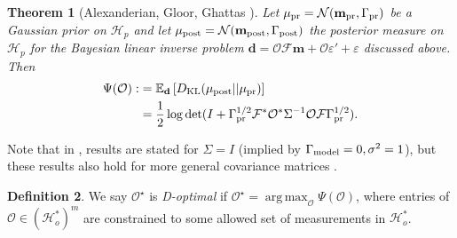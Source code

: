 \documentclass[ba]{imsart}
\newcommand{\eps}{\varepsilon}
\newcommand{\hilp}{\mathcal{H}_p}
\newcommand{\hilo}{\mathcal{H}_o}
\newcommand{\obs}{\mathcal{O}}
\newcommand{\fwd}{\mathcal{F}}
\newcommand{\tar}{\Psi}
\DeclareMathOperator*{\argmax}{arg\,max}
\newcommand{\data}{\mathbf{d}}
\newcommand{\param}{\mathbf{m}}
\newcommand{\normal}{\mathcal{N}}
\newcommand{\pr}{\mu_{\textup{pr}}} \newcommand{\post}{\mu_{\textup{post}}} \newcommand{\prmean}{\param_{\textup{pr}}} \newcommand{\postmean}{\param_{\textup{post}}} \newcommand{\postcov}{\Gamma_{\textup{post}}} \newcommand{\prcov}{\Gamma_{\textup{pr}}} \newcommand{\modcov}{\Gamma_{\textup{model}}} \newcommand{\tmp}{\mathcal{G}}
\newcommand{\opt}{\mathcal{D}}
\theoremstyle{plain}
\newtheorem{theorem}{Theorem}
\theoremstyle{definition}
\newtheorem{definition}[theorem]{Definition}
\theoremstyle{remark}
\providecommand{\DIFaddtex}[1]{{\protect\color{blue}\uwave{#1}}} %
\providecommand{\DIFdeltex}[1]{{\protect\color{red}\sout{#1}}}                      %
\providecommand{\DIFaddbegin}{} %
\providecommand{\DIFaddend}{} %
\providecommand{\DIFdelbegin}{} %
\providecommand{\DIFdelend}{} %
\providecommand{\DIFadd}[1]{\texorpdfstring{\DIFaddtex{#1}}{#1}} %
\providecommand{\DIFdel}[1]{\texorpdfstring{\DIFdeltex{#1}}{}} %
\newcommand{\DIFscaledelfig}{0.5}
\newlength{\DIFdelgraphicswidth} %
\newlength{\DIFdelgraphicsheight} %
\newcommand{\DIFaddincludegraphics}[2][]{{\color{blue}\fbox{\DIFOincludegraphics[#1]{#2}}}} %
\newcommand{\DIFdelincludegraphics}[2][]{%
\sbox{\DIFdelgraphicsbox}{\DIFOincludegraphics[#1]{#2}}%
\settoboxwidth{\DIFdelgraphicswidth}{\DIFdelgraphicsbox} %
\settoboxtotalheight{\DIFdelgraphicsheight}{\DIFdelgraphicsbox} %
\scalebox{\DIFscaledelfig}{%
\parbox[b]{\DIFdelgraphicswidth}{\usebox{\DIFdelgraphicsbox}\\[-\baselineskip] \rule{\DIFdelgraphicswidth}{0em}}\llap{\resizebox{\DIFdelgraphicswidth}{\DIFdelgraphicsheight}{%
\setlength{\unitlength}{\DIFdelgraphicswidth}%
\begin{picture}(1,1)%
\thicklines\linethickness{2pt} %
{\color[rgb]{1,0,0}\put(0,0){\framebox(1,1){}}}%
{\color[rgb]{1,0,0}\put(0,0){\line( 1,1){1}}}%
{\color[rgb]{1,0,0}\put(0,1){\line(1,-1){1}}}%
\end{picture}%
}\hspace*{3pt}}} %
} %
\DeclareRobustCommand{\DIFaddbegin}{\DIFOaddbegin \let\includegraphics\DIFaddincludegraphics} %
\DeclareRobustCommand{\DIFaddend}{\DIFOaddend \let\includegraphics\DIFOincludegraphics} %
\DeclareRobustCommand{\DIFdelbegin}{\DIFOdelbegin \let\includegraphics\DIFdelincludegraphics} %
\DeclareRobustCommand{\DIFdelend}{\DIFOaddend \let\includegraphics\DIFOincludegraphics} %
\begin{document}
\begin{theorem}[Alexanderian, Gloor, Ghattas \cite{AlexanderianGloorGhattas14}]\label{thm:d_optimality}
  Let \(\pr = \normal(\prmean,\prcov)\) be a Gaussian prior on \(\hilp\)
  and let \(\post = \normal(\postmean,\postcov)\) the posterior measure
  on \(\hilp\) for the Bayesian linear inverse problem \(\data = \obs
  \fwd\param + \obs \eps' + \eps\) discussed above. Then
  \DIFdelbegin %
\DIFdelend \DIFaddbegin \begin{align}\label{eq:objective}
    \begin{split}
      \tar( \obs) :&= \mathbb{E}_{\data}\left [ D_{\text{KL}} (\post || \pr ) \right ] \\
&= \frac{1}{2} \log \det 
      ( I + \prcov^{1/2}  \fwd ^* \obs^* \Sigma^{-1} \obs \fwd \prcov^{1/2}).
    \end{split}
  \end{align}\DIFaddend 
\end{theorem}

Note that in \cite{AlexanderianGloorGhattas14,
  alexanderian2018efficient}, results are stated for \(\Sigma=I\)
(implied by \(\modcov = 0,\sigma^2=1\)), but these results also hold
for more general covariance matrices
\cite[p. 681]{AlexanderianGloorGhattas14}.

\begin{definition}\label{def:d_optimality}
  We say \DIFdelbegin \DIFdel{\(\obs^{\star}\) }\DIFdelend \DIFaddbegin \DIFadd{\(\opt\) }\DIFaddend is \emph{D-optimal} if \DIFdelbegin \DIFdel{\(\obs^{\star} =
  \argmax_{\obs} \tar(\obs)\)}\DIFdelend \DIFaddbegin \DIFadd{\(\opt =
  \argmax_{\obs} \tar(\obs)\)}\DIFaddend , where entries of \(\obs \in (\hilo^*)^m\)
  are constrained to some allowed set of measurements in \(\hilo^*\).
\end{definition}
\end{document}
